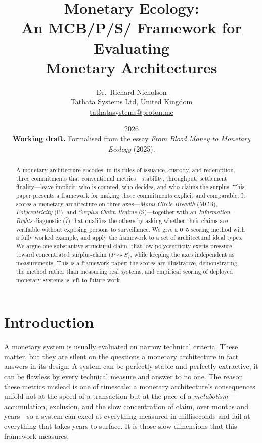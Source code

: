 \documentclass[11pt]{article}
\title{\textbf{Monetary Ecology:\\
An MCB/P/S/\Iax{} Framework for Evaluating\\
Monetary Architectures}}
\author{%
  Dr.\ Richard Nicholson\\[4pt]
  \small Tathata Systems Ltd, United Kingdom\\
  \small \href{mailto:tathatasystems@proton.me}{tathatasystems@proton.me}
}
\date{2026\\[4pt]
\small \textbf{Working draft.} Formalised from the essay
\emph{From Blood Money to Monetary Ecology} (2025).}
\theoremstyle{definition}
\newcommand{\Iax}{\ensuremath{\hat{I}}}
\begin{document}
\maketitle

\begin{abstract}
A monetary architecture encodes, in its rules of issuance, custody, and redemption,
three commitments that conventional metrics---stability, throughput, settlement
finality---leave implicit: who is counted, who decides, and who claims the surplus.
This paper presents a framework for making those commitments explicit and comparable.
It scores a monetary architecture on three axes---\emph{Moral Circle Breadth} (MCB),
\emph{Polycentricity} (P), and \emph{Surplus-Claim Regime} (S)---together with an
\emph{Information-Rights} diagnostic ($\Iax$) that qualifies the others by asking
whether their claims are verifiable without exposing persons to surveillance. We give
a 0--5 scoring method with a fully worked example, and apply the framework to a set of
architectural ideal types. We argue one substantive structural claim, that low
polycentricity exerts pressure toward concentrated surplus-claim ($P \rightsquigarrow
S$), while keeping the axes independent as measurements. This is a framework paper:
the scores are illustrative, demonstrating the method rather than measuring real
systems, and empirical scoring of deployed monetary systems is left to future work.
\end{abstract}

\section{Introduction}
\label{sec:intro}

A monetary system is usually evaluated on narrow technical criteria. These matter,
but they are silent on the questions a monetary architecture in fact answers in its
design. A system can be perfectly stable and perfectly extractive; it can be flawless by
every technical measure and answer to no one. The reason these metrics mislead is one
of timescale: a monetary architecture's consequences unfold not at the speed of a
transaction but at the pace of a \emph{metabolism}---accumulation, exclusion, and the
slow concentration of claim, over months and years---so a system can excel at
everything measured in milliseconds and fail at everything that takes years to
surface. It is those slow dimensions that this framework measures.
\end{document}
